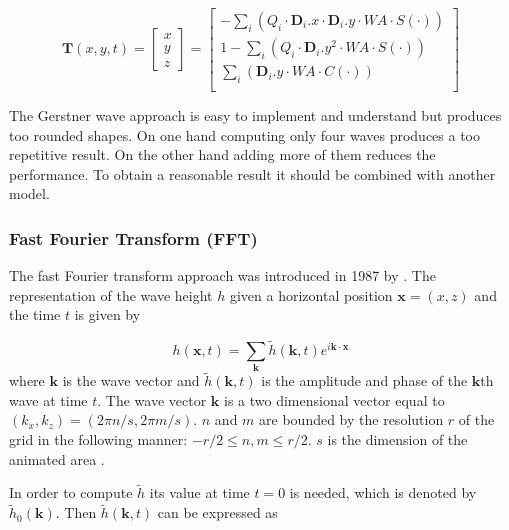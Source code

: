 \begin{equation}\label{eq:gerstner_tangent}
    \textbf{T}(x,y,t)=\begin{bmatrix}x\\ y\\ z\end{bmatrix}=\begin{bmatrix}
    - \sum_{i}(Q_i \cdot \textbf{D}_i.x \cdot \textbf{D}_i.y\cdot WA \cdot
    S(\cdot))\\
    1 - \sum_{i}(Q_i \cdot \textbf{D}_i.y^2 \cdot WA \cdot S(\cdot))\\
    \sum_{i}(\textbf{D}_i.y \cdot WA \cdot C(\cdot))\\\end{bmatrix}
\end{equation}

The Gerstner wave approach is easy to implement and understand but produces too
rounded shapes. On one hand computing only four waves produces a too repetitive
result. On the other hand adding more of them reduces the performance. To obtain
a reasonable result it should be combined with another model.

\subsubsection{Fast Fourier Transform (FFT)}\label{subsub:fft}


The fast Fourier transform approach was introduced in 1987 by
\citeauthor{mastin1987fourier} \autocite{mastin1987fourier}. The representation
of the wave height $h$ given a horizontal position $\textbf{x} = (x,z)$ and the
time $t$ is given by

\begin{equation}
    h(\textbf{x}, t) = \sum_{\textbf{k}}^{} \tilde{h}(\textbf{k},
    t)e^{i\textbf{k}\cdot\textbf{x}}
\end{equation}
%
where $\textbf{k}$ is the wave vector and $\tilde{h}(\textbf{k}, t)$ is the
amplitude and phase of the $\textbf{k}$th wave at time $t$. The wave vector
$\textbf{k}$ is a two dimensional vector equal to $(k_x, k_z) = (2\pi n/s, 2\pi
m / s)$. $n$ and $m$ are bounded by the resolution $r$ of the grid in the
following manner: $-r/2 \leq n,m \leq r/2$. $s$ is the dimension of the animated
area \autocite{jensen2001deep,darles2011survey}.

In order to compute $\tilde{h}$ its value at time $t=0$ is needed, which is
denoted by $\tilde{h}_0(\textbf{k})$. Then $\tilde{h}(\textbf{k}, t)$ can be
expressed as

